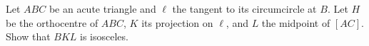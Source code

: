Let $ABC$ be an acute triangle and $\ell$ the tangent to its circumcircle at $B$. Let $H$ be the orthocentre of $ABC$, $K$ its projection on $\ell$, and $L$ the midpoint of $[AC]$. Show that $BKL$ is isosceles.
